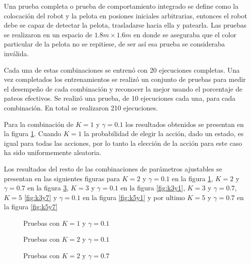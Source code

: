 Una prueba completa o prueba de comportamiento integrado se define como la colocaci\'on del robot y la pelota en posiones iniciales arbitrarias, entonces el robot debe se capaz de detectar la pelota, trasladarse hacia ella y patearla. Las pruebas se realizaron en un espacio de $1.8 m \times 1.6 m$
en donde se aseguraba que el color particular de la pelota no se repitiese, de ser así esa prueba se consideraba inválida.

Cada una de estas combinaciones se entrenó con 20 ejecuciones completas. Una vez completados los entrenamientos se realizó un conjunto de pruebas para medir el desempeño de cada combinación y reconocer la mejor usando el porcentaje de pateos efectivos. Se realizó una prueba, de 10 ejecuciones cada una, para cada combinación. En total se realizaron 210 ejecuciones. 

Para la combinaci\'on de $K = 1$ y $ \gamma = 0.1 $ los resultados obtenidos se presentan en la figura  \ref{fig:k1y1}. Cuando $K = 1$ la probabilidad de elegir la acci\'on, dado un estado, es igual para todas las acciones, por lo tanto la elección de la acción para este caso ha sido uniformemente aleatoria. 

Los resultados del resto de las combinaciones de par\'ametros ajustables se presentan en las siguientes figuras para $K = 2$ y $ \gamma = 0.1 $ en la figura \ref{fig:k1y1}, $K = 2$ y $ \gamma = 0.7 $ en la figura \ref{fig:k2y7}, $K = 3$ y $ \gamma = 0.1 $ en la figura \ref{fig:k3y1}, $K = 3$ y $ \gamma = 0.7 $, $K = 5$ \ref{fig:k3y7} y $ \gamma = 0.1 $ en la figura \ref{fig:k5y1} y por ultimo $K = 5$ y $ \gamma = 0.7 $ en la figura \ref{fig:k5y7}

\begin{figure}
\caption{Pruebas con  $K = 1$ y $ \gamma = 0.1 $}
\label{fig:k1y1}
\end{figure} 

\begin{figure}[h]
\caption{Pruebas con $K = 2$ y $ \gamma = 0.1 $}
\label{fig:k2y1}
\end{figure} 

\begin{figure}[h]
\caption{Pruebas  con $K = 2$ y $ \gamma = 0.7 $}
\label{fig:k2y7}
\end{figure} 


